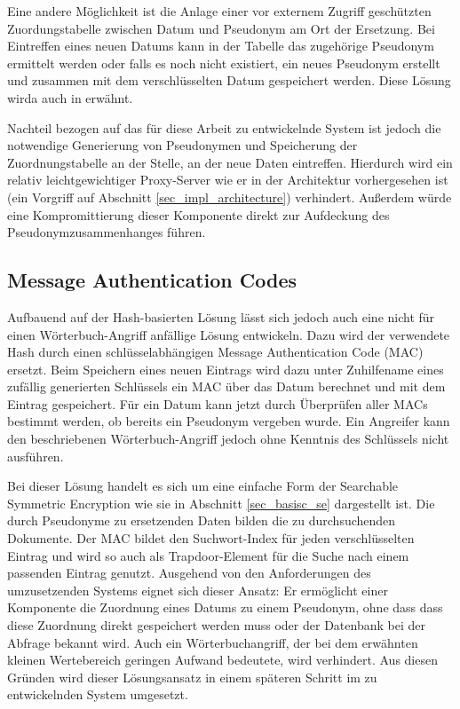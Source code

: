 Eine andere Möglichkeit ist die Anlage einer vor externem Zugriff geschützten Zuordungstabelle zwischen Datum und Pseudonym am Ort der Ersetzung. Bei Eintreffen eines neuen Datums kann in der Tabelle das zugehörige Pseudonym ermittelt werden oder falls es noch nicht existiert, ein neues Pseudonym erstellt und zusammen mit dem verschlüsselten Datum gespeichert werden. Diese Lösung wirda auch in \cite{goh2003} erwähnt.

Nachteil bezogen auf das für diese Arbeit zu entwickelnde System ist jedoch die notwendige Generierung von Pseudonymen und Speicherung der Zuordnungstabelle an der Stelle, an der neue Daten eintreffen. Hierdurch wird ein relativ leichtgewichtiger Proxy-Server wie er in der Architektur vorhergesehen ist (ein Vorgriff auf Abschnitt \ref{sec_impl_architecture}) verhindert. Außerdem würde eine Kompromittierung dieser Komponente direkt zur Aufdeckung des Pseudonymzusammenhanges führen. 

\subsection{Message Authentication Codes}

Aufbauend auf der Hash-basierten Lösung lässt sich jedoch auch eine nicht für einen Wörterbuch-Angriff anfällige Lösung entwickeln. Dazu wird der verwendete Hash durch einen schlüsselabhängigen Message Authentication Code (MAC) ersetzt. Beim Speichern eines neuen Eintrags wird dazu unter Zuhilfename eines zufällig generierten Schlüssels ein MAC über das Datum berechnet und mit dem Eintrag gespeichert. Für ein Datum kann jetzt durch Überprüfen aller MACs bestimmt werden, ob bereits ein Pseudonym vergeben wurde. Ein Angreifer kann den beschriebenen Wörterbuch-Angriff jedoch ohne Kenntnis des Schlüssels nicht ausführen.

Bei dieser Lösung handelt es sich um eine einfache Form der Searchable Symmetric Encryption wie sie in Abschnitt \ref{sec_basisc_se} dargestellt ist. Die durch Pseudonyme zu ersetzenden Daten bilden die zu durchsuchenden Dokumente. Der MAC bildet den Suchwort-Index für jeden verschlüsselten Eintrag und wird so auch als Trapdoor-Element für die Suche nach einem passenden Eintrag genutzt. Ausgehend von den Anforderungen des umzusetzenden Systems eignet sich dieser Ansatz: Er ermöglicht einer Komponente die Zuordnung eines Datums zu einem Pseudonym, ohne dass dass diese Zuordnung direkt gespeichert werden muss oder der Datenbank bei der Abfrage bekannt wird. Auch ein Wörterbuchangriff, der bei dem erwähnten kleinen Wertebereich geringen Aufwand bedeutete, wird verhindert. Aus diesen Gründen wird dieser Lösungsansatz in einem späteren Schritt im zu entwickelnden System umgesetzt.

